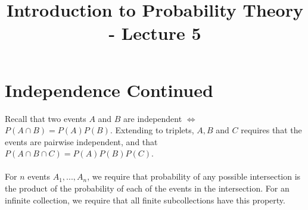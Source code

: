 \documentclass[12pt]{article} %
\title{Introduction to Probability Theory - Lecture 5}
\begin{document}
\maketitle
\section{Independence Continued}
Recall that two events $A$ and $B$ are independent $\iff$ $P(A\cap B) = P(A)P(B)$. Extending to triplets, $A,B$ and $C$ requires that the events are pairwise independent, and that $P(A\cap B \cap C) = P(A)P(B)P(C)$.\\\\
For $n$ events $A_1,...,A_n$, we require that probability of any possible intersection is the product of the probability of each of the events in the intersection. For an infinite collection, we require that all finite subcollections have this property.
\end{document}
